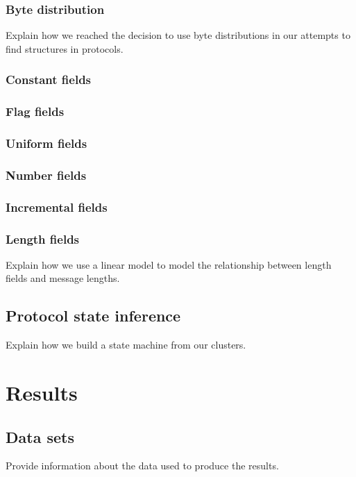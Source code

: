 \documentclass[a4paper]{report}
\begin{document}
\subsection{Byte distribution}
Explain how we reached the decision to use byte distributions in our attempts
to find structures in protocols.

\subsection{Constant fields}

\subsection{Flag fields}

\subsection{Uniform fields}

\subsection{Number fields}

\subsection{Incremental fields}

\subsection{Length fields}
Explain how we use a linear model to model the relationship between length
fields and message lengths.

\section{Protocol state inference}
Explain how we build a state machine from our clusters.

\chapter{Results}

\section{Data sets}
Provide information about the data used to produce the results.
\end{document}
